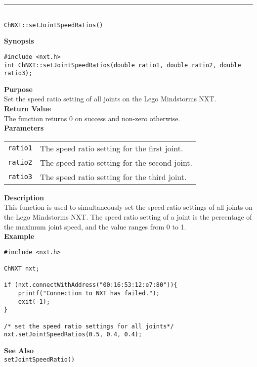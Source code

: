 \noindent
\vspace{5pt}
\rule{4.5in}{0.015in}\\
\noindent
{\LARGE \texttt{ChNXT::setJointSpeedRatios()} }\\


\noindent
{\bf Synopsis}
\vspace{-8pt}
\begin{verbatim}
#include <nxt.h>
int ChNXT::setJointSpeedRatios(double ratio1, double ratio2, double ratio3);
\end{verbatim}

\noindent
{\bf Purpose}\\
Set the speed ratio setting of all joints on the Lego Mindstorms NXT.\\

\noindent
{\bf Return Value}\\
The function returns 0 on success and non-zero otherwise.\\

\noindent
{\bf Parameters}\\
\vspace{-0.1in}
\begin{description}
\item
\begin{tabular}{ p{20mm}p{135mm} }
\texttt{ratio1}&The speed ratio setting for the first joint.\\
\texttt{ratio2}&The speed ratio setting for the second joint.\\
\texttt{ratio3}&The speed ratio setting for the third joint.\\
\end{tabular}
\end{description}

\noindent
{\bf Description}\\
This function is used to simultaneously set the speed ratio settings 
of all joints on the Lego Mindstorms NXT. The speed ratio setting of
a joint is the percentage of the maximum joint speed, and the value 
ranges from 0 to 1.\\

\noindent
{\bf Example}
\begin{verbatim}
#include <nxt.h> 

ChNXT nxt;

if (nxt.connectWithAddress("00:16:53:12:e7:80")){
    printf("Connection to NXT has failed.");
    exit(-1);
}
    
/* set the speed ratio settings for all joints*/
nxt.setJointSpeedRatios(0.5, 0.4, 0.4);
\end{verbatim}

\noindent
{\bf See Also}\\
\texttt{setJointSpeedRatio()}\\
